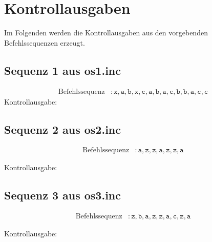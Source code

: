 \section{Kontrollausgaben}
Im Folgenden werden die Kontrollausgaben aus den vorgebenden Befehlssequenzen erzeugt.


\subsection{Sequenz 1 aus os1.inc}

\begin{align*}
\text{Befehlssequenz} &: \mathtt{x,a,b,x,c,a,b,a,c,b,b,a,c,c}
\end{align*}
Kontrollausgabe:





\subsection{Sequenz 2 aus os2.inc}
\begin{align*}
\text{Befehlssequenz} &: \mathtt{a,z,z,a,z,z,a}
\end{align*}

Kontrollausgabe:



\subsection{Sequenz 3 aus os3.inc}

\begin{align*}
\text{Befehlssequenz} &: \mathtt{z,b,a,z,z,a,c,z,a}
\end{align*}

Kontrollausgabe:
